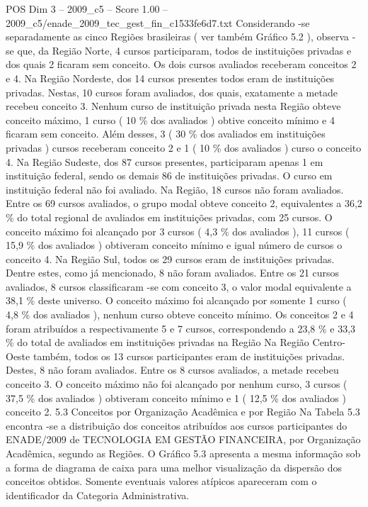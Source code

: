 \begin{textsample}{POS Dim 3 – 2009\_c5 – Score 1.00 – 2009\_c5/enade\_2009\_tec\_gest\_fin\_c1533fe6d7.txt}
Considerando -se separadamente as cinco Regiões brasileiras ( ver também Gráfico 5.2 ), observa -se que, da Região Norte, 4 cursos participaram, todos de instituições privadas e dos quais 2 ficaram sem conceito.
Os dois cursos avaliados receberam conceitos 2 e 4.
Na Região Nordeste, dos 14 cursos presentes todos eram de instituições privadas.
Nestas, 10 cursos foram avaliados, dos quais, exatamente a metade recebeu conceito 3.
Nenhum curso de instituição privada nesta Região obteve conceito máximo, 1 curso ( 10 \% dos avaliados ) obtive conceito mínimo e 4 ficaram sem conceito.
Além desses, 3 ( 30 \% dos avaliados em instituições privadas ) cursos receberam conceito 2 e 1 ( 10 \% dos avaliados ) curso o conceito 4.
Na Região Sudeste, dos 87 cursos presentes, participaram apenas 1 em instituição federal, sendo os demais 86 de instituições privadas.
O curso em instituição federal não foi avaliado.
Na Região, 18 cursos não foram avaliados.
Entre os 69 cursos avaliados, o grupo modal obteve conceito 2, equivalentes a 36,2 \% do total regional de avaliados em instituições privadas, com 25 cursos.
O conceito máximo foi alcançado por 3 cursos ( 4,3 \% dos avaliados ), 11 cursos ( 15,9 \% dos avaliados ) obtiveram conceito mínimo e igual número de cursos o conceito 4.
Na Região Sul, todos os 29 cursos eram de instituições privadas.
Dentre estes, como já mencionado, 8 não foram avaliados.
Entre os 21 cursos avaliados, 8 cursos classificaram -se com conceito 3, o valor modal equivalente a 38,1 \% deste universo.
O conceito máximo foi alcançado por somente 1 curso ( 4,8 \% dos avaliados ), nenhum curso obteve conceito mínimo.
Os conceitos 2 e 4 foram atribuídos a respectivamente 5 e 7 cursos, correspondendo a 23,8 \% e 33,3 \% do total de avaliados em instituições privadas na Região Na Região Centro-Oeste também, todos os 13 cursos participantes eram de instituições privadas.
Destes, 8 não foram avaliados.
Entre os 8 cursos avaliados, a metade recebeu conceito 3.
O conceito máximo não foi alcançado por nenhum curso, 3 cursos ( 37,5 \% dos avaliados ) obtiveram conceito mínimo e 1 ( 12,5 \% dos avaliados ) conceito 2. 5.3 Conceitos por Organização Acadêmica e por Região Na Tabela 5.3 encontra -se a distribuição dos conceitos atribuídos aos cursos participantes do ENADE/2009 de TECNOLOGIA EM GESTÃO FINANCEIRA, por Organização Acadêmica, segundo as Regiões.
O Gráfico 5.3 apresenta a mesma informação sob a forma de diagrama de caixa para uma melhor visualização da dispersão dos conceitos obtidos.
Somente eventuais valores atípicos apareceram com o identificador da Categoria Administrativa.

\end{textsample}
